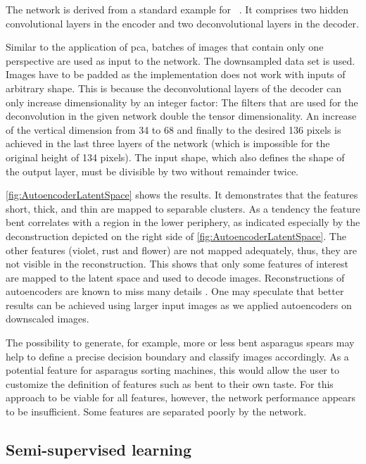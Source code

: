 The network is derived from a standard example for ~\citep{keras2020vae}. It comprises two hidden convolutional layers in the encoder and two deconvolutional layers in the decoder.

Similar to the application of \acrshort{pca}, batches of images that contain only one perspective are used as input to the network. The downsampled data set is used. Images have to be padded as the implementation does not work with inputs of arbitrary shape. This is because the deconvolutional layers of the decoder can only increase dimensionality by an integer factor: The filters that are used for the deconvolution in the given network double the tensor dimensionality. An increase of the vertical dimension from 34 to 68 and finally to the desired 136 pixels is achieved in the last three layers of the network (which is impossible for the original height of 134 pixels). The input shape, which also defines the shape of the output layer, must be divisible by two without remainder twice.

\bigskip
\autoref{fig:AutoencoderLatentSpace} shows the results. It demonstrates that the features short, thick, and thin are mapped to separable clusters. As a tendency the feature bent correlates with a region in the lower periphery, as indicated especially by the deconstruction depicted on the right side of \autoref{fig:AutoencoderLatentSpace}. The other features (violet, rust and flower) are not mapped adequately, thus, they are not visible in the reconstruction. This shows that only some features of interest are mapped to the latent space and used to decode images. Reconstructions of autoencoders are known to miss many details \citep{kramer1991nonlinear}. One may speculate that better results can be achieved using larger input images as we applied autoencoders on downscaled images.

The possibility to generate, for example, more or less bent asparagus spears may help to define a precise decision boundary and classify images accordingly. As a potential feature for asparagus sorting machines, this would allow the user to customize the definition of features such as bent to their own taste. For this approach to be viable for all features, however, the network performance appears to be insufficient. Some features are separated poorly by the network.


\subsection{Semi-supervised learning}
\label{sec:SemiSupervisedLearning}

